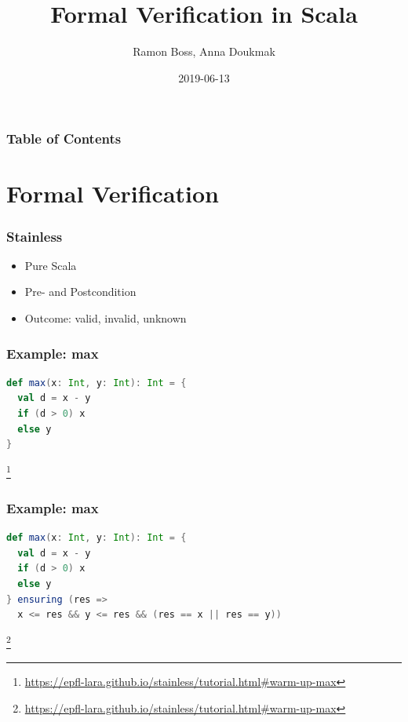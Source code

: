 \documentclass{beamer}
\newcommand\blfootnote[1]{%
  \begingroup
  \renewcommand\thefootnote{}\footnote{#1}%
  \addtocounter{footnote}{-1}%
  \endgroup
}
\begin{document}
\title{Formal Verification in Scala}
\author{Ramon Boss, Anna Doukmak}

\date{2019-06-13}

\frame{\titlepage}


\begin{frame}
  \frametitle{Table of Contents}
  \tableofcontents
\end{frame}


\section{Formal Verification}


\begin{frame}
\frametitle{Stainless}
\begin{itemize}
  \item Pure Scala
  \item Pre- and Postcondition
  \item Outcome: valid, invalid, unknown
\end{itemize}
\end{frame}


\begin{frame}[fragile]
\frametitle{Example: max}
\begin{lstlisting}[language=Scala]
def max(x: Int, y: Int): Int = {
  val d = x - y
  if (d > 0) x
  else y
}
\end{lstlisting}
\blfootnote{\url{https://epfl-lara.github.io/stainless/tutorial.html\#warm-up-max}}
\end{frame}


\begin{frame}[fragile]
\frametitle{Example: max}
\begin{lstlisting}[language=Scala]
def max(x: Int, y: Int): Int = {
  val d = x - y
  if (d > 0) x
  else y
} ensuring (res =>
  x <= res && y <= res && (res == x || res == y))
\end{lstlisting}
\blfootnote{\url{https://epfl-lara.github.io/stainless/tutorial.html\#warm-up-max}}
\end{frame}
\end{document}
